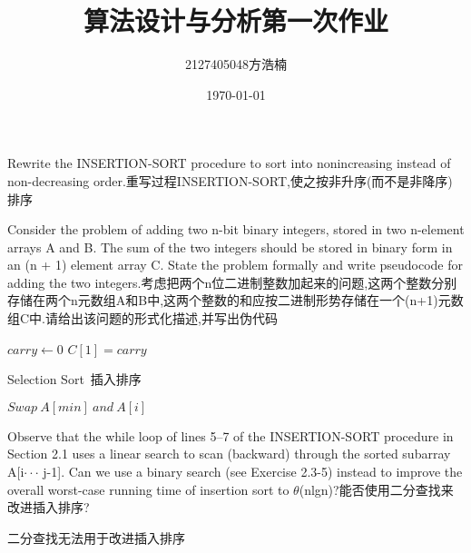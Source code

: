 \documentclass{ctexart}
\title{算法设计与分析第一次作业}
\author{2127405048方浩楠}
\date{\today}
\begin{document}
\begin{algorithm}
\caption{Rewrite the INSERTION-SORT procedure to sort into nonincreasing instead of non-decreasing order.\newline 重写过程INSERTION-SORT,使之按非升序(而不是非降序)排序}\label{algorithm}
\end{algorithm}

\begin{algorithm}
    \caption{Consider the problem of adding two n-bit binary integers, stored in two n-element arrays A and B. The sum of the two integers should be stored in binary form in an (n + 1) element array C. State the problem formally and write pseudocode for adding the two integers.\newline 考虑把两个n位二进制整数加起来的问题,这两个整数分别存储在两个n元数组A和B中,这两个整数的和应按二进制形势存储在一个(n+1)元数组C中.请给出该问题的形式化描述,并写出伪代码}\label{algorithm}
    $carry \leftarrow 0$\;
    $C[1] = carry$
\end{algorithm}

\begin{algorithm}
    \caption{Selection Sort\ 插入排序}\label{algorithm}
    $Swap\ A[min]\ and\ A[i]$
\end{algorithm}

\begin{algorithm}
    \caption{Observe that the while loop of lines 5–7 of the INSERTION-SORT procedure in Section 2.1 uses a linear search to scan (backward) through the sorted subarray A[i$\cdot\cdot\cdot$ j-1]. Can we use a binary search (see Exercise 2.3-5) instead to improve the overall worst-case running time of insertion sort to $\theta$(nlgn)?\newline 能否使用二分查找来改进插入排序?}\label{algoorithm}
    二分查找无法用于改进插入排序
\end{algorithm}
    
\end{document}
